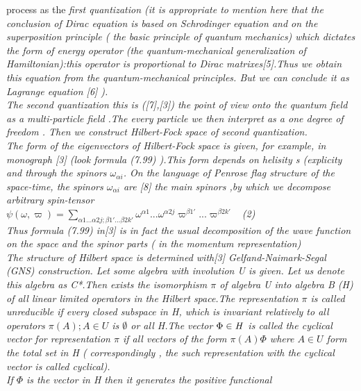 \documentclass[a4paper,12pt] {article}
\begin{document}
 process as the \it  first quantization \rm   (it is appropriate to mention here that the conclusion of Dirac
equation is based on  Schrodinger equation and on the superposition principle ( the basic
principle of  quantum mechanics) which dictates the form of energy operator (the quantum-mechanical
generalization of Hamiltonian):this operator is proportional to  Dirac matrixes[5].Thus we obtain this
equation from the \it quantum-mechanical principles\rm . But we can conclude it as  Lagrange equation
[6]  ).
\\\it The second quantization \rm this is ([7],[3]) the  point of view onto the quantum field as a
 \it multi-particle field \rm .The every particle we then interpret as a \it one degree of freedom \rm .
Then we construct   \it Hilbert-Fock space of second quantization\rm  .
\\The form of the  eigenvectors of Hilbert-Fock space is given, for example, in monograph [3]
 (look formula (7.99) ).This form depends on helisity s (explicity and through the spinors
 $\omega_{\alpha i} $. On the language of Penrose \it flag \rm  structure of the space-time, the  spinors
$\omega_{\alpha i} $ are [8]  \it the main spinors \rm ,by which we decompose  arbitrary spin-tensor
  \\$ \psi( \omega,\varpi ) =\sum_{\alpha 1...\alpha 2j;\beta 1'...\beta 2k'} \omega^{\alpha1}...\omega^{\alpha2j} \varpi ^{\beta 1'}...\varpi^{\beta 2k'} $
\ (2)
\\Thus  formula (7.99) in[3] is in fact the usual decomposition of the wave function on the space and  the
 spinor parts ( in the  momentum representation)
\\The structure of Hilbert space is determined with[3]  \it  Gelfand-Naimark-Segal \\\rm (\it GNS\rm)\it
construction.
 \rm Let some algebra with involution U is given. Let us denote this algebra as C*.Then  exists the
 isomorphism $ \pi$ of algebra U into  algebra B (\it H\rm) of all linear limited operators in the Hilbert
 space.The representation $ \pi$ is called \it unreducible \rm if  every closed subspace in \it H\rm , which
is invariant relatively to all operators  $\pi (A); A\in U $ is
 $\emptyset$ or all \it H\rm.The vector $\Phi \in \it H $ \rm  is called  \it the cyclical vector \rm for  representation $ \pi$ if all vectors of the form $\pi (A) \Phi$ where $ A \in U
 $ form the total set in \it H\rm
 ( correspondingly , the such representation with the cyclical vector is called \it cyclical\rm  ).
\\If $\Phi$ is  the vector in  \it H \rm  then it generates the \it positive functional
\end{document}
